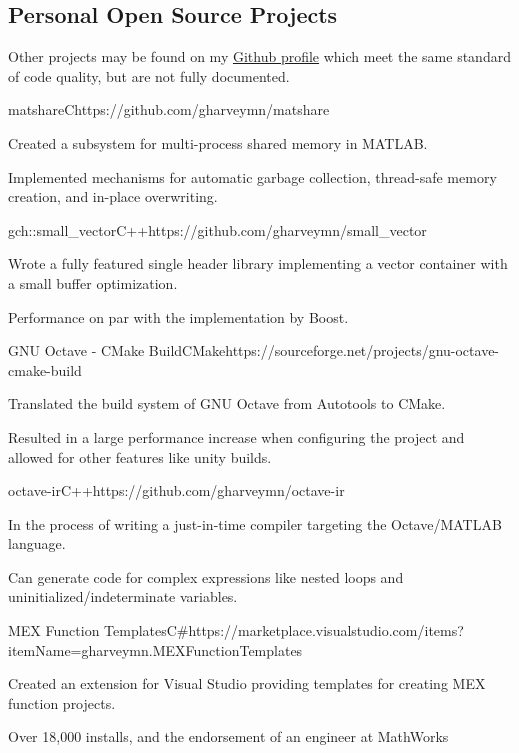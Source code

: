 \documentclass[
  9pt, %
]{FreemanCV}
\begin{document}
\begin{paracol}{2}
\section{Personal Open Source Projects}
\label{sec:Open Source}

Other projects may be found on my
\href{https://github.com/gharveymn?tab=repositories}{Github profile} which meet the same
standard of code quality, but are not fully documented.

\medskip

\begin{project}{matshare}{C}{https://github.com/gharveymn/matshare}
  \item Created a subsystem for multi-process shared memory in MATLAB.
  \item Implemented mechanisms for automatic garbage collection, thread-safe
        memory creation, and in-place overwriting.
\end{project}

 \begin{project}{gch::small\_vector}{C++}{https://github.com/gharveymn/small\_vector}
   \item Wrote a fully featured single header library implementing a vector container with a small buffer optimization.
   \item Performance on par with the implementation by Boost.
 \end{project}

\begin{project}{GNU Octave - CMake Build}{CMake}{https://sourceforge.net/projects/gnu-octave-cmake-build}
  \item Translated the build system of GNU Octave from Autotools to CMake.
  \item Resulted in a large performance increase when configuring the project
        and allowed for other features like unity builds.
\end{project}

\begin{project}{octave-ir}{C++}{https://github.com/gharveymn/octave-ir}
  \item In the process of writing a just-in-time compiler targeting the Octave/MATLAB language.
  \item Can generate code for complex expressions like nested loops and uninitialized/indeterminate
        variables.
\end{project}

\begin{project}{MEX Function Templates}{C\#}{https://marketplace.visualstudio.com/items?itemName=gharveymn.MEXFunctionTemplates}
  \item Created an extension for Visual Studio providing templates for creating MEX function projects.
  \item Over 18,000 installs, and the endorsement of an engineer at MathWorks
\end{project}


\end{paracol}
\end{document}
